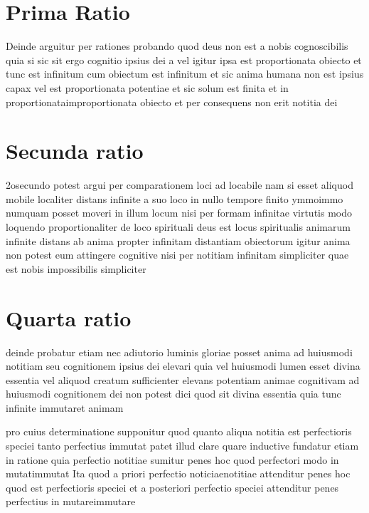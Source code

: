 \documentclass[twoside, openright]{report}
\begin{document}
        \bigskip
         \section*{Prima Ratio} 
        \pstart
        Deinde arguitur per rationes probando quod deus non est a nobis cognoscibilis quia si sic sit ergo cognitio ipsius dei a vel igitur ipsa est proportionata obiecto et tunc est infinitum  cum obiectum est infinitum et sic anima humana non est ipsius capax  vel est proportionata potentiae et sic solum est finita et in proportionataimproportionata obiecto et per consequens non erit notitia dei
        \pend
      
        \bigskip
         \section*{Secunda ratio} 
        \pstart
        2osecundo potest argui per comparationem loci ad locabile  nam si esset aliquod mobile localiter distans infinite a suo loco in nullo tempore finito ymmoimmo numquam posset moveri in illum locum nisi per formam infinitae virtutis modo loquendo proportionaliter de loco spirituali deus est locus spiritualis animarum infinite distans ab anima propter infinitam distantiam obiectorum igitur anima non potest eum attingere cognitive nisi per notitiam infinitam simpliciter quae est nobis impossibilis simpliciter
        \pend
      
        \bigskip
         \section*{Quarta ratio} 
        \pstart
        deinde probatur etiam nec adiutorio luminis gloriae posset anima ad huiusmodi notitiam seu cognitionem ipsius dei elevari quia vel huiusmodi lumen esset divina essentia vel aliquod creatum sufficienter elevans potentiam animae cognitivam ad huiusmodi cognitionem dei non potest dici quod sit divina essentia quia tunc infinite immutaret animam
        \pend
     
        \pstart
        pro cuius determinatione supponitur quod quanto aliqua notitia est perfectioris speciei tanto perfectius immutat patet illud clare quare inductive fundatur etiam in ratione quia perfectio notitiae sumitur penes hoc quod perfectori modo in mutatimmutat Ita quod a priori perfectio noticiaenotitiae attenditur penes hoc quod est perfectioris speciei et a posteriori perfectio speciei attenditur penes perfectius in mutareimmutare
        \pend
     
\end{document}
